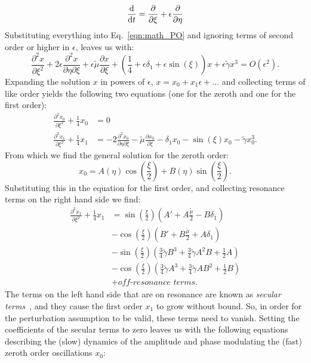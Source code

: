 \[\dv{}{t} = \pdv{}{\xi} + \epsilon \pdv{}{\eta}\]
Substituting everything into Eq.~\ref{eqn:math_PO} and ignoring terms of second order or higher in $\epsilon$, leaves us with: 
\begin{equation}
\frac{\partial^2x}{\partial \xi^2} + 2\epsilon\frac{\partial^2x}{\partial \eta\partial \xi} + \epsilon\tilde{\mu} \frac{\partial x}{\partial \xi} + \left(\frac{1}{4} + \epsilon \delta_1 + \epsilon \sin(\xi)\right)x + \epsilon \tilde{\gamma} x^3 = O(\epsilon^2). \label{eqn:pertubed_math_PO}
\end{equation}
Expanding the solution $x$ in powers of $\epsilon$, $x = x_0 + x_1\epsilon + \dots$ and collecting terms of like order yields the following two equations (one for the zeroth and one for the first order):
\begin{align}
   \frac{\partial^2x_0}{\partial \xi^2} + \frac{1}{4}x_0 &= 0  \\ 
   \frac{\partial^2x_1}{\partial \xi^2} + \frac{1}{4}x_1 &= -2\frac{\partial^2x_0}{\partial \eta\partial \xi} - \tilde{\mu} \frac{\partial x_0}{\partial \xi} - \delta_1x_0 - \sin(\xi)x_0 - \tilde{\gamma} x_0^3. 
\end{align}
From which we find the general solution for the zeroth order: 
\begin{equation}
x_0 = A(\eta)\cos\left(\frac{\xi}{2}\right) + B(\eta)\sin\left(\frac{\xi}{2}\right).  
\end{equation}
Substituting this in the equation for the first order, and collecting resonance terms on the right hand side we find:
\begin{align*}
 \frac{\partial^2x_1}{\partial \xi^2} + \frac{1}{4}x_1 &=  \sin\left(\frac{\xi}{2}\right)\left(A' + A\frac{\tilde{\mu}}{2} - B\delta_1\right)\\
 &- \cos\left(\frac{\xi}{2}\right)\left(B' + B\frac{\tilde{\mu}}{2} + A\delta_1\right)\\
    & -\sin\left(\frac{\xi}{2}\right)\left(\frac{3}{4}\tilde{\gamma} B^3 + \frac{3}{4}\tilde{\gamma} A^2 B + \frac{1}{2}A\right) \\
    &- \cos\left(\frac{\xi}{2}\right)\left(\frac{3}{4}\tilde{\gamma} A^3 + \frac{3}{4}\tilde{\gamma} AB^2 + \frac{1}{2}B\right)\\
& + \textit{off-resonance terms}.
\end{align*}
The terms on the left hand side that are on resonance are known as \emph{secular terms}~\cite{pertubation_methods}, and they cause the first order $x_1$ to grow without bound. So, in order for the perturbation assumption to be valid, these terms need to vanish. Setting the coefficients of the secular terms to zero leaves us with the following equations describing the (slow) dynamics of the amplitude and phase modulating the (fast) zeroth order oscillations $x_0$:
